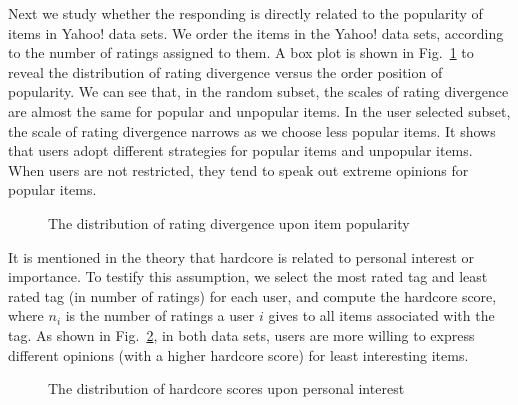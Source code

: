 \documentclass[sigconf]{acmart}
\begin{document}
Next we study whether the responding is directly related to the popularity of items in Yahoo! data sets. We order the items in the Yahoo! data sets, according to the number of ratings assigned to them. A box plot is shown in Fig.~\ref{fig:popularity} to reveal the distribution of rating divergence versus the order position of popularity. We can see that, in the random subset, the scales of rating divergence are almost the same for popular and unpopular items. In the user selected subset, the scale of rating divergence narrows as we choose less popular items. It shows that users adopt different strategies for popular items and unpopular items. When users are  not restricted,  they tend to speak out extreme opinions for popular items.

\begin{figure}[htbp]
\centering
\centering
{}
\caption{The distribution of rating divergence upon item popularity}
\label{fig:popularity}
\end{figure}

It is mentioned in the theory\cite{Neolle-Neumann1993spiral} that hardcore is related to personal interest or importance. To testify this assumption, we select the most rated tag and least rated tag (in number of ratings) for each user, and compute the hardcore score, where $n_i$ is the number of ratings a user $i$ gives to all items associated with the tag.  As shown in Fig.~\ref{fig:personalinterest}, in both data sets, users are more willing to express different opinions (with a higher hardcore score) for least interesting items.

\begin{figure}[htbp]
\centering
\centering
{}
\caption{The distribution of hardcore scores upon personal interest}
\label{fig:personalinterest}
\end{figure}
\end{document}
